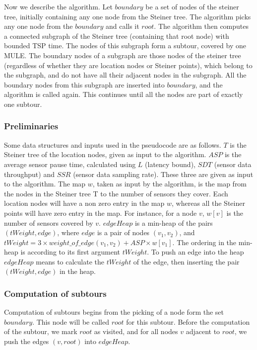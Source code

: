Now we describe the algorithm. Let $boundary$ be a set of nodes of the steiner tree, initially containing any one node from the Steiner tree. The algorithm picks any one node from the $boundary$ and calls it $root$. The algorithm then computes a connected subgraph of the Steiner tree (containing that root node) with bounded TSP time. The nodes of this subgraph form a subtour, covered by one MULE. The boundary nodes of a subgraph are those nodes of the steiner tree (regardless of whether they are location nodes or Steiner points), which belong to the subgraph, and do not have all their adjacent nodes in the subgraph. All the boundary nodes from this subgraph are inserted into $boundary$, and the algorithm is called again. This continues until all the nodes are part of exactly one subtour.

\subsubsection{Preliminaries}

Some data structures and inputs used in the pseudocode are as follows. $T$ is the Steiner tree of the location nodes, given as input to the algorithm. $ASP$ is the average sensor pause time, calculated using $L$ (latency bound), $SDT$ (sensor data throughput) and $SSR$ (sensor data sampling rate). These three are given as input to the algorithm. The map $w$, taken as input by the algorithm, is the map from the nodes in the Steiner tree T to the number of sensors they cover. Each location nodes will have a non zero entry in the map $w$, whereas all the Steiner points will have zero entry in the map. For instance, for a node $v$, $w[v]$ is the number of sensors covered by $v$. $edgeHeap$ is a min-heap of the pairs $(tWeight,edge)$, where $edge$ is a pair of nodes $(v_1,v_2)$, and $tWeight = 3 \times weight\_of\_edge(v_1,v_2) + ASP \times w[v_1]$. The ordering in the min-heap is according to its first argument $tWeight$. To push an edge into the heap $edgeHeap$ means to calculate the $tWeight$ of the edge, then inserting the pair $(tWeight,edge)$ in the heap.

\subsubsection{Computation of subtours}

Computation of subtours begins from the picking of a node form the set $boundary$. This node will be called $root$ for this subtour. Before the computation of the subtour, we mark $root$ as visited, and for all nodes $v$ adjacent to $root$, we push the edges $(v,root)$ into $edgeHeap$.

